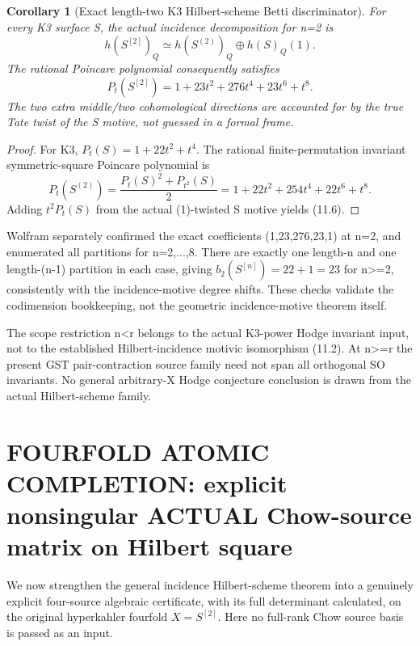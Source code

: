 \documentclass[11pt]{article}
\newtheorem{corollary}[theorem]{Corollary}
\begin{document}
\begin{corollary}[Exact length-two K3 Hilbert-scheme Betti discriminator]
For every K3 surface S, the
actual incidence decomposition
for n=2 is
\[
 h(S^{[2]})_Q
   \simeq h(S^{(2)})_Q
                     \oplus h(S)_Q(1).
\]
The rational Poincare polynomial
consequently satisfies
\[
 \boxed{
 P_t(S^{[2]})
    =1+23t^2+276t^4+23t^6+t^8 .}                  \tag{11.6}
\]
The two extra middle/two
cohomological directions
are accounted for by the true
Tate twist of the S motive,
not guessed in a formal frame.
\end{corollary}
\begin{proof}
For K3,
\(P_t(S)=1+22t^2+t^4\).
The rational finite-permutation
invariant symmetric-square
Poincare polynomial is
\[
 P_t(S^{(2)})=
   \frac{P_t(S)^2+P_{t^2}(S)}2
 =1+22t^2+254t^4+22t^6+t^8 .
\]
Adding \(t^2P_t(S)\) from
the actual (1)-twisted
S motive yields (11.6).
\end{proof}

Wolfram separately confirmed
the exact coefficients
(1,23,276,23,1) at n=2,
and enumerated all partitions
for n=2,...,8. There are
exactly one length-n and
one length-(n-1)
partition in each case, giving
\(b_2(S^{[n]})=22+1=23\)
for n>=2, consistently with
the incidence-motive
degree shifts. These checks
validate the codimension
bookkeeping, not the geometric
incidence-motive theorem itself.

The scope restriction n<r
belongs to the actual K3-power
Hodge invariant input,
not to the established
Hilbert-incidence motivic
isomorphism (11.2).
At n>=r the present GST
pair-contraction source
family need not span all
orthogonal SO invariants.
No general arbitrary-X
Hodge conjecture conclusion
is drawn from the actual
Hilbert-scheme family.

\section{FOURFOLD ATOMIC COMPLETION: explicit nonsingular ACTUAL Chow-source matrix on Hilbert square}
We now strengthen the general incidence
Hilbert-scheme theorem into a genuinely
explicit four-source algebraic certificate,
with its full determinant calculated,
on the original hyperkahler fourfold
\(X=S^{[2]}\). Here no full-rank
Chow source basis is passed as
an input.
\end{document}
